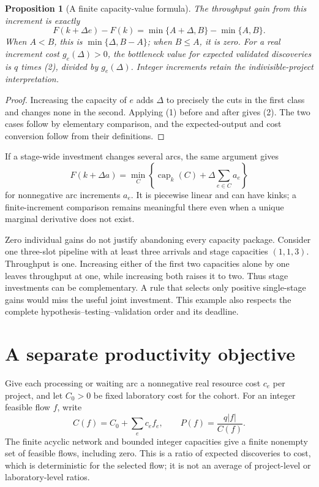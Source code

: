 \documentclass[11pt]{article}
\newtheorem{proposition}[theorem]{Proposition}
\theoremstyle{definition}
\begin{document}
\begin{proposition}[A finite capacity-value formula]
The throughput gain from this increment is exactly
\[
 F(k+\Delta e)-F(k)=\min\{A+\Delta,B\}-\min\{A,B\}.
 \tag{2}
\]
When $A<B$, this is $\min\{\Delta,B-A\}$; when $B\le A$, it is zero. For a real increment cost $g_e(\Delta)>0$, the bottleneck value for expected validated discoveries is $q$ times (2), divided by $g_e(\Delta)$. Integer increments retain the indivisible-project interpretation.
\end{proposition}
\begin{proof}
Increasing the capacity of $e$ adds $\Delta$ to precisely the cuts in the first class and changes none in the second. Applying (1) before and after gives (2). The two cases follow by elementary comparison, and the expected-output and cost conversion follow from their definitions.
\end{proof}
If a stage-wide investment changes several arcs, the same argument gives
\[
 F(k+\Delta a)=\min_C\left\{\operatorname{cap}_k(C)+\Delta\sum_{e\in C}a_e\right\}
\]
for nonnegative arc increments $a_e$. It is piecewise linear and can have kinks; a finite-increment comparison remains meaningful there even when a unique marginal derivative does not exist.

Zero individual gains do not justify abandoning every capacity package. Consider one three-slot pipeline with at least three arrivals and stage capacities $(1,1,3)$. Throughput is one. Increasing either of the first two capacities alone by one leaves throughput at one, while increasing both raises it to two. Thus stage investments can be complementary. A rule that selects only positive single-stage gains would miss the useful joint investment. This example also respects the complete hypothesis--testing--validation order and its deadline.

\section*{A separate productivity objective}
Give each processing or waiting arc a nonnegative real resource cost $c_e$ per project, and let $C_0>0$ be fixed laboratory cost for the cohort. For an integer feasible flow $f$, write
\[
 C(f)=C_0+\sum_ec_ef_e,\qquad
 P(f)=\frac{q|f|}{C(f)}.
\]
The finite acyclic network and bounded integer capacities give a finite nonempty set of feasible flows, including zero. This is a ratio of expected discoveries to cost, which is deterministic for the selected flow; it is not an average of project-level or laboratory-level ratios.
\end{document}
